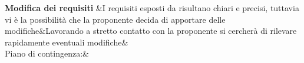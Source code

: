 \documentclass[PianoDiProgetto.tex]{subfiles}
\begin{document}
\begin{longtabu}
	 \textbf{Modifica dei requisiti} &{\small I requisiti esposti da \Proponente risultano chiari e precisi, tuttavia vi è la possibilità che la proponente decida di apportare delle modifiche}&{\small Lavorando a stretto contatto con la proponente si 
		cercherà di rilevare rapidamente eventuali modifiche}&  \\
	Piano di contingenza:&\\
	\hhline{====}
\end{longtabu}
\end{document}
